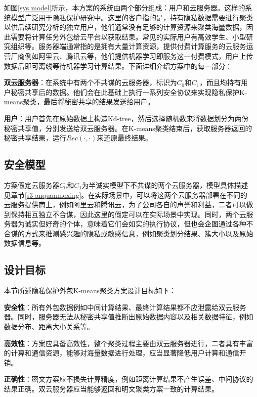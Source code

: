 如图\ref{sys model}所示，本方案的系统由两个部分组成：用户和云服务器。这样的系统模型广泛用于隐私保护研究中\cite{wu2020secure,bunn2007secure}。这里的客户指的是，持有隐私数据需要进行聚类以供后续研究分析的独立用户，他们通常没有足够的计算资源来聚类海量数据，因此需要将计算任务外包给云平台以获取结果。常见的实际用户有高效学生、小型研究组织等。服务器端通常指的是拥有大量计算资源，提供付费计算服务的云服务运营厂商例如阿里云、腾讯云等，他们提供机器学习即服务这一付费模式，用户上传数据后即可离线等待机器学习计算结果。下面详细介绍方案中的每一部分：

\begin{compactitem}
	\item \textbf{双云服务器}：在系统中有两个不共谋的云服务器，标识为$ C_0 $和$ C_1 $，而且均持有用户秘密共享后的数据。他们会在此基础上执行一系列安全协议来实现隐私保护K-means聚类，最后将秘密共享的结果发送给用户。
	\item \textbf{用户}：用户首先在原始数据上构造Kd-tree，然后选择随机数来将数据划分为两份秘密共享值，分别发送给双云服务器。在K-means聚类结束后，获取服务器返回的秘密共享结果，运行$ Rec(\cdot,\cdot) $来还原最终结果。
\end{compactitem}

\subsection{安全模型}
方案假定云服务器$C_0$和$C_1$为半诚实模型下不共谋的两个云服务器，模型具体描述见章节\ref{s3-anquanmoxing}。在实际场景中，可以将这两个云服务器部署在不同的云服务提供商上，例如阿里云和腾讯云，为了公司各自的声誉和利益，二者可以做到保持相互独立不合谋，因此这里的假定可以在实际场景中实现。同时，两个云服务器为诚实但好奇的个体，意味着它们会如实的执行协议，但也会企图通过各种不合谋的方式来推测感兴趣的隐私或敏感信息，例如聚类划分结果、簇大小以及原始数据信息等。
\subsection{设计目标}
本节所述隐私保护外包K-means聚类方案设计目标如下：
\begin{compactitem}
	\item \textbf{安全性}：所有外包数据例如中间计算结果、最终计算结果都不应泄露给双云服务器。同时，服务器无法从秘密共享值推断出原始数据内容以及相关数据特征，例如数据分布、距离大小关系等。
	\item \textbf{高效性}：方案应具备高效性，整个聚类过程主要由双云服务器进行，二者具有丰富的计算和通信资源，能够对海量数据进行处理，应当显著降低用户计算和通信开销。
	\item \textbf{正确性}：密文方案应不损失计算精度，例如距离计算结果不产生误差、中间协议的结果正确。双云服务器应当能够返回和明文聚类方案一致的计算结果。
\end{compactitem}
